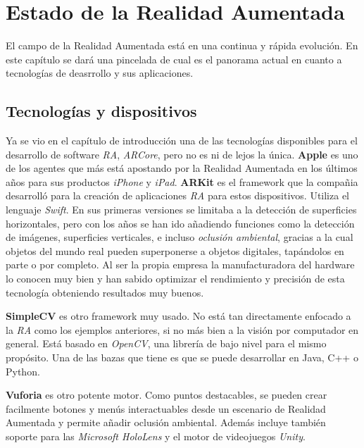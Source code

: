 \chapter{Estado de la Realidad Aumentada}

El campo de la Realidad Aumentada está en una continua y rápida evolución. En este capítulo se dará una pincelada de cual es el panorama actual en cuanto a tecnologías de deasrrollo y sus aplicaciones.

\section{Tecnologías y dispositivos}

Ya se vio en el capítulo de introducción una de las tecnologías disponibles para el desarrollo de software \textit{RA}, \textit{ARCore}, pero no es ni de lejos la única. \textbf{Apple} es uno de los agentes que más está apostando por la Realidad Aumentada en los últimos años para sus productos \textit{iPhone} y \textit{iPad}. \textbf{ARKit}\cite{arkit} es el framework que la compañia desarrolló para la creación de aplicaciones \textit{RA} para estos dispositivos. Utiliza el lenguaje \textit{Swift}. En sus primeras versiones se limitaba a la detección de superficies horizontales, pero con los años se han ido añadiendo funciones como la detección de imágenes, superficies verticales, e incluso \textit{oclusión ambiental}, gracias a la cual objetos del mundo real pueden superponerse a objetos digitales, tapándolos en parte o por completo. Al ser la propia empresa la manufacturadora del hardware lo conocen muy bien y han sabido optimizar el rendimiento y precisión de esta tecnología obteniendo resultados muy buenos.

\textbf{SimpleCV}\cite{simplecv} es otro framework muy usado. No está tan directamente enfocado a la \textit{RA} como los ejemplos anteriores, si no más bien a la visión por computador en general. Está basado en \textit{OpenCV}, una librería de bajo nivel para el mismo propósito. Una de las bazas que tiene es que se puede desarrollar en Java, C++ o Python.

\textbf{Vuforia}\cite{vuforia} es otro potente motor. Como puntos destacables, se pueden crear facilmente botones y menús interactuables desde un escenario de Realidad Aumentada y permite añadir oclusión ambiental. Además incluye también soporte para las \textit{Microsoft HoloLens} y el motor de videojuegos \textit{Unity}.

